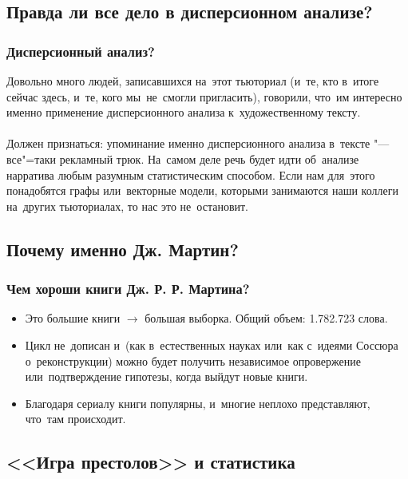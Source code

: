 \documentclass{beamer}
\begin{document}
\subsection{Правда ли все дело в дисперсионном анализе?} %




\begin{frame}
\frametitle{Дисперсионный анализ?}
Довольно много людей, записавшихся на~этот тьюториал (и~те, кто в~итоге сейчас здесь, и~те, кого мы~не~смогли пригласить), говорили, что~им интересно именно применение дисперсионного анализа к~художественному тексту.\\~\\

Должен признаться: упоминание именно дисперсионного анализа в~тексте "--- все"=таки рекламный трюк. На~самом деле речь будет идти об~анализе нарратива любым разумным статистическим способом. Если нам для~этого понадобятся графы или~векторные модели, которыми занимаются наши коллеги на~других тьюториалах, то нас это не~остановит.
\end{frame}


\subsection{Почему именно Дж. Мартин?}

\begin{frame}
\frametitle{Чем хороши книги Дж. Р. Р. Мартина?}
\begin{itemize}
\item Это \alert{большие} книги $\rightarrow$ большая выборка. Общий объем: 1.782.723 слова.
\item Цикл не~дописан и~(как в~естественных науках или~как с~идеями Соссюра о~реконструкции) можно будет получить независимое \alert{опровержение или~подтверждение} гипотезы, когда выйдут новые книги.
\item Благодаря сериалу книги \alert{популярны}, и~многие неплохо представляют, что~там происходит.
\end{itemize}
\end{frame}

\subsection{<<Игра престолов>> и статистика}
\end{document}
